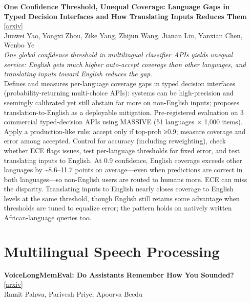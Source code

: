 \documentclass[12pt,letterpaper]{article}
\begin{document}
\medskip

{\small\textbf{One Confidence Threshold, Unequal Coverage: Language Gaps in Typed Decision Interfaces and How Translating Inputs Reduces Them}} {\scriptsize[\href{https://arxiv.org/abs/2610.37688}{arxiv}]}\\
{\scriptsize Junwei Yao, Yongxi Zhou, Zike Yang, Zhijun Wang, Jianan Liu, Yanxian Chen, Wenbo Ye}\\

{\small\textit{One global confidence threshold in multilingual classifier APIs yields unequal service: English gets much higher auto-accept coverage than other languages, and translating inputs toward English reduces the gap.}}\\[1pt]
{\footnotesize Defines and measures per-language coverage gaps in typed decision interfaces (probability-returning multi-choice APIs): systems can be high-precision and seemingly calibrated yet still abstain far more on non-English inputs; proposes translation-to-English as a deployable mitigation. Pre-registered evaluation on 3 commercial typed-decision APIs using MASSIVE (51 languages × 1,000 items). Apply a production-like rule: accept only if top-prob ≥0.9; measure coverage and error among accepted. Control for accuracy (including reweighting), check whether ECE flags issues, test per-language thresholds for fixed error, and test translating inputs to English. At 0.9 confidence, English coverage exceeds other languages by \textasciitilde{}8.6--11.7 points on average---even when predictions are correct in both languages---so non-English users are routed to humans more. ECE can miss the disparity. Translating inputs to English nearly closes coverage to English levels at the same threshold, though English still retains some advantage when thresholds are tuned to equalize error; the pattern holds on natively written African-language queries too.}

\medskip


\section*{Multilingual Speech Processing}

{\small\textbf{VoiceLongMemEval: Do Assistants Remember How You Sounded?}} {\scriptsize[\href{https://arxiv.org/abs/2609.00570}{arxiv}]}\\
{\scriptsize Ramit Pahwa, Parivesh Priye, Apoorva Beedu}\\
\end{document}
